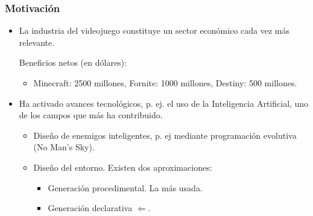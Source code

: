 \begin{frame}
	\frametitle{Motivación}

	\begin{itemize}
		\item<1-> La \textcolor{UDCpink}{industria del videojuego} constituye un sector económico cada vez más relevante.
		
		\vspace{0.5em}
		
		\pause
		
		Beneficios netos (en dólares):
		
		\begin{itemize}
			\item Minecraft: 2500 millones, Fornite: 1000 millones, Destiny: 500 millones.
		\end{itemize}
	
		\vspace{1em}
		
		\item<3-> Ha activado avances tecnológicos, p. ej. el uso de la \textcolor{UDCpink}{Inteligencia Artificial}, uno de los campos que más ha contribuido.
		
		\vspace{0.5em}
		
		\begin{itemize}
			\item<4-> Diseño de \textcolor{UDCpink}{enemigos inteligentes}, p. ej mediante programación evolutiva (No Man's Sky).
			
			\vspace{0.5em}
			
			\item<5-> \textcolor{UDCpink}{Diseño del entorno}. Existen dos aproximaciones:
			
			\vspace{0.5em}
			
			\begin{itemize}
				\item<5->\small Generación procedimental. La más usada.
				
				\vspace{0.5em}
				
				\item<6->\small \textcolor{UDCpink}{Generación declarativa} $\Leftarrow$.
			\end{itemize}
		\end{itemize}
	\end{itemize}
\end{frame}

